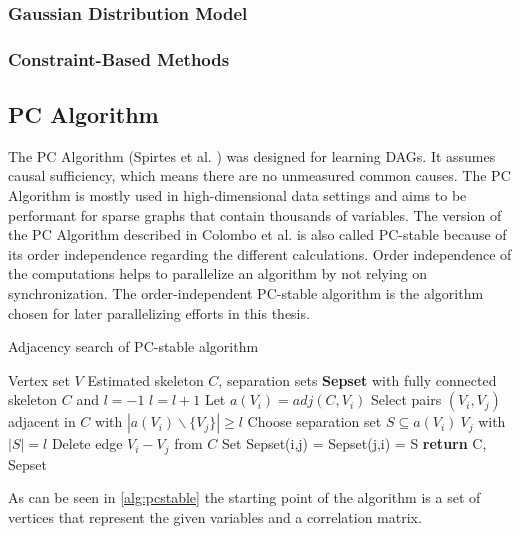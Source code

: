 \subsubsection{Gaussian Distribution Model}


\subsubsection{Constraint-Based Methods}



\subsection{PC Algorithm}
The PC Algorithm (Spirtes et al. \cite{spirtesCausationPredictionSearch1993}) was designed for learning DAGs. It assumes causal sufficiency, which means there are no unmeasured common causes. The PC Algorithm is mostly used in high-dimensional data settings and aims to be performant for sparse graphs that contain thousands of variables. \cite{kalisch_understanding_2010}
The version of the PC Algorithm described in Colombo et al. \cite{colomboOrderIndependentConstraintBasedCausal} is also called PC-stable because of its order independence regarding the different calculations. Order independence of the computations helps to parallelize an algorithm by not relying on synchronization. The order-independent PC-stable algorithm is the algorithm chosen for later parallelizing efforts in this thesis.

\begin{algorithm}
    \caption{Adjacency search of PC-stable algorithm \cite{colomboOrderIndependentConstraintBasedCausal}}
    \label{alg:pcstable}
    \begin{algorithmic}[1]
    \Require Vertex set $V$
    \Ensure Estimated skeleton $C$, separation sets \textbf{Sepset}
    \State with fully connected skeleton $C$ and $l = -1$
    \Repeat 
        \State $l=l+1$
            \State Let $a(V_i) = adj(C,V_i)$
        \EndFor
        \Repeat
            \State Select pairs $(V_i,V_j)$ adjacent in $C$ with $|a(V_i)\backslash\{V_j\}| \geq l$
            \Repeat
                \State Choose separation set $S \subseteq a(V_i ) \ {V_j }$ with $| S | = l$
                    \State Delete edge $V_i - V_j$ from $C$
                    \State Set Sepset(i,j) = Sepset(j,i) = S
                \EndIf
    \State \textbf{return} C, Sepset
    \end{algorithmic}
\end{algorithm}

As can be seen in \ref{alg:pcstable} the starting point of the algorithm is a set of vertices that represent the given variables and a correlation matrix.
